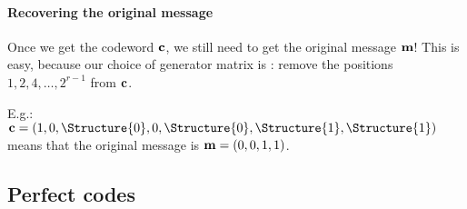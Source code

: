 \documentclass[a4paper, 11pt, openany]{book}
\begin{document}
\paragraph{Recovering the original message}
Once we get the codeword ${\bf c}$, we still need to get the original message ${\bf m}$! This is easy, because our choice of generator matrix is : remove the positions $1,2, 4, \ldots, 2^{r-1}$ from ${\bf c}$.

E.g.: ${\bf c} = (1,0,\Structure{0},0,\Structure{0},\Structure{1},\Structure{1})$ means that the original message is ${\bf m} = (0,0,1,1)$.



\subsection{Perfect codes}
\end{document}
